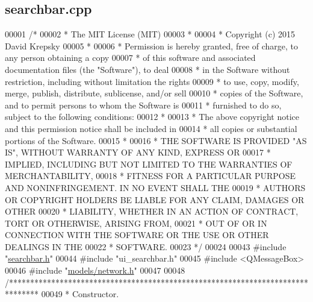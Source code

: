 \hypertarget{searchbar_8cpp_source}{}\subsection{searchbar.\+cpp}
\label{searchbar_8cpp_source}

\begin{DoxyCode}
00001 \textcolor{comment}{/*}
00002 \textcolor{comment}{ * The MIT License (MIT)}
00003 \textcolor{comment}{ *}
00004 \textcolor{comment}{ * Copyright (c) 2015 David Krepsky}
00005 \textcolor{comment}{ *}
00006 \textcolor{comment}{ * Permission is hereby granted, free of charge, to any person obtaining a copy}
00007 \textcolor{comment}{ * of this software and associated documentation files (the "Software"), to deal}
00008 \textcolor{comment}{ * in the Software without restriction, including without limitation the rights}
00009 \textcolor{comment}{ * to use, copy, modify, merge, publish, distribute, sublicense, and/or sell}
00010 \textcolor{comment}{ * copies of the Software, and to permit persons to whom the Software is}
00011 \textcolor{comment}{ * furnished to do so, subject to the following conditions:}
00012 \textcolor{comment}{ *}
00013 \textcolor{comment}{ * The above copyright notice and this permission notice shall be included in}
00014 \textcolor{comment}{ * all copies or substantial portions of the Software.}
00015 \textcolor{comment}{ *}
00016 \textcolor{comment}{ * THE SOFTWARE IS PROVIDED "AS IS", WITHOUT WARRANTY OF ANY KIND, EXPRESS OR}
00017 \textcolor{comment}{ * IMPLIED, INCLUDING BUT NOT LIMITED TO THE WARRANTIES OF MERCHANTABILITY,}
00018 \textcolor{comment}{ * FITNESS FOR A PARTICULAR PURPOSE AND NONINFRINGEMENT. IN NO EVENT SHALL THE}
00019 \textcolor{comment}{ * AUTHORS OR COPYRIGHT HOLDERS BE LIABLE FOR ANY CLAIM, DAMAGES OR OTHER}
00020 \textcolor{comment}{ * LIABILITY, WHETHER IN AN ACTION OF CONTRACT, TORT OR OTHERWISE, ARISING FROM,}
00021 \textcolor{comment}{ * OUT OF OR IN CONNECTION WITH THE SOFTWARE OR THE USE OR OTHER DEALINGS IN THE}
00022 \textcolor{comment}{ * SOFTWARE.}
00023 \textcolor{comment}{ */}
00024 
00043 \textcolor{preprocessor}{#include "\hyperlink{searchbar_8h}{searchbar.h}"}
00044 \textcolor{preprocessor}{#include "ui\_searchbar.h"}
00045 \textcolor{preprocessor}{#include <QMessageBox>}
00046 \textcolor{preprocessor}{#include "\hyperlink{network_8h}{models/network.h}"}
00047 
00048 \textcolor{comment}{/*******************************************************************************}
00049 \textcolor{comment}{* Constructor.}

\end{DoxyCode}
